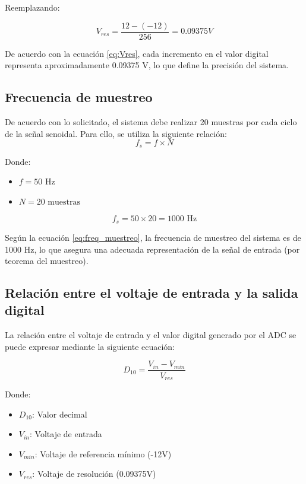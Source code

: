\documentclass[12pt, a4paper]{article}
\begin{document}
    Reemplazando:

    $$ V_{res} = \frac{12-(-12)}{256} = 0.09375V $$

    De acuerdo con la ecuación \ref{eq:Vres}, cada incremento en el valor digital representa aproximadamente 0.09375 V, lo que define la precisión del sistema.

    \subsection{Frecuencia de muestreo}

    De acuerdo con lo solicitado, el sistema debe realizar 20 muestras por cada ciclo de la señal senoidal. Para ello, se utiliza la siguiente relación:
    \begin{equation}
        f_s = f \times N 
        \label{eq:freq_muestreo}
    \end{equation}

    Donde:
    \begin{itemize}
        \item $f = 50 \text{ Hz}$
        \item $N = 20 \text{ muestras}$
    \end{itemize}

    $$ f_s = 50 \times 20 = 1000 \text{ Hz} $$

    Según la ecuación \ref{eq:freq_muestreo}, la frecuencia de muestreo del sistema es de 1000 Hz, lo que asegura una adecuada representación de la señal de entrada (por teorema del muestreo).

    \subsection{Relación entre el voltaje de entrada y la salida digital}

    La relación entre el voltaje de entrada y el valor digital generado por el ADC se puede expresar mediante la siguiente ecuación:

    \begin{equation}
        D_{10} = \frac{V_{in} - V_{min}}{V_{res}}
        \label{eq:D10}
    \end{equation}

    Donde:
    \begin{itemize}
        \item $D_{10}$: Valor decimal
        \item $V_{in}$: Voltaje de entrada
        \item $V_{min}$: Voltaje de referencia mínimo (-12V)
        \item $V_{res}$: Voltaje de resolución (0.09375V)
    \end{itemize}
\end{document}
